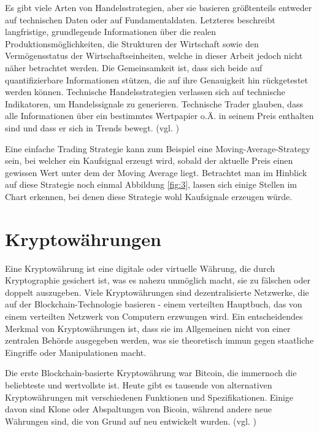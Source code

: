 \documentclass[oneside]{ausarbeitung}
\begin{document}
Es gibt viele Arten von Handelsstrategien, aber sie basieren größtenteils entweder auf technischen Daten oder auf Fundamentaldaten. Letzteres beschreibt langfristige, grundlegende Informationen über die realen Produktionsmöglichkeiten, die Strukturen der Wirtschaft sowie den Vermögensstatus der Wirtschaftseinheiten, welche in dieser Arbeit jedoch nicht näher betrachtet werden\cite{fundamentaldaten}. Die Gemeinsamkeit ist, dass sich beide auf quantifizierbare Informationen stützen, die auf ihre Genauigkeit hin rückgetestet werden können.
Technische Handelsstrategien verlassen sich auf technische Indikatoren, um Handelssignale zu generieren. Technische Trader glauben, dass alle Informationen über ein bestimmtes Wertpapier o.Ä. in seinem Preis enthalten sind und dass er sich in Trends bewegt. (vgl. \cite{trading_strategy}) 

Eine einfache Trading Strategie kann zum Beispiel eine Moving-Average-Strategy sein, bei welcher ein Kaufsignal erzeugt wird, sobald der aktuelle Preis einen gewissen Wert unter dem der Moving Average liegt. Betrachtet man im Hinblick auf diese Strategie noch einmal Abbildung \ref{fig:3}, lassen sich einige Stellen im Chart erkennen, bei denen diese Strategie wohl Kaufsignale erzeugen würde.


\section{Kryptowährungen}
\label{sec:kryptowährungen}

Eine Kryptowährung ist eine digitale oder virtuelle Währung, die durch Kryptographie gesichert ist, was es nahezu unmöglich macht, sie zu fälschen oder doppelt auszugeben. Viele Kryptowährungen sind dezentralisierte Netzwerke, die auf der Blockchain-Technologie basieren - einem verteilten Hauptbuch, das von einem verteilten Netzwerk von Computern erzwungen wird. Ein entscheidendes Merkmal von Kryptowährungen ist, dass sie im Allgemeinen nicht von einer zentralen Behörde ausgegeben werden, was sie theoretisch immun gegen staatliche Eingriffe oder Manipulationen macht.

Die erste Blockchain-basierte Kryptowährung war Bitcoin, die immernoch die beliebteste und wertvollste ist. Heute gibt es tausende von alternativen Kryptowährungen mit verschiedenen Funktionen und Spezifikationen. Einige davon sind Klone oder Abspaltungen von Bicoin, während andere neue Währungen sind, die von Grund auf neu entwickelt wurden. (vgl. \cite{cryptocurrency_explained})
\end{document}
